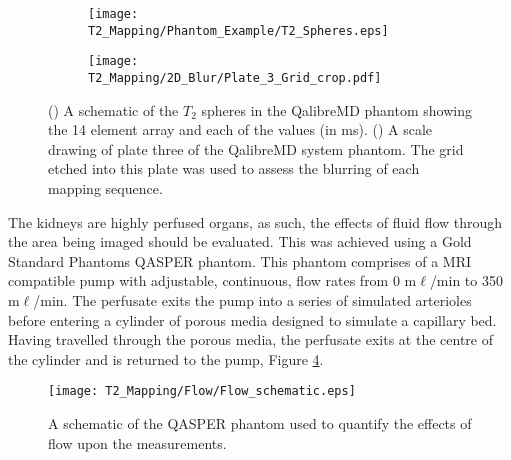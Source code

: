 \begin{figure}[H]
\centering
\begin{subfigure}[c]{0.47\textwidth}
	\centering
	\texttt{[image: T2\_Mapping/Phantom\_Example/T2\_Spheres.eps]}
	\caption{}
	\label{fig:t2_phantom_schematic}
\end{subfigure}
\hfill
\begin{subfigure}[c]{0.47\textwidth}
	\centering
	\texttt{[image: T2\_Mapping/2D\_Blur/Plate\_3\_Grid\_crop.pdf]}
	\caption{}
	\label{fig:t2_blur_grid}
\end{subfigure}
\caption{() A schematic of the $T_2$ spheres in the QalibreMD phantom showing the 14 element \ttwo array and each of the \ttwo values (in ms). () A scale drawing of plate three of the QalibreMD system phantom. The grid etched into this plate was used to assess the blurring of each \ttwo mapping sequence.}
\label{fig:t2_nist_phantom}
\end{figure}

The kidneys are highly perfused organs, as such, the effects of fluid flow through the area being imaged should be evaluated. This was achieved using a Gold Standard Phantoms \ac{QASPER} phantom. This phantom comprises of a \ac{MRI} compatible pump with adjustable, continuous, flow rates from 0 m$\ell$/min to 350 m$\ell$/min. The perfusate exits the pump into a series of simulated arterioles before entering a cylinder of porous media designed to simulate a capillary bed. Having travelled through the porous media, the perfusate exits at the centre of the cylinder and is returned to the pump, Figure \ref{fig:t2_flow_phantom_schematic}. 

\begin{figure}[H]
	\centering
	\texttt{[image: T2\_Mapping/Flow/Flow\_schematic.eps]}
	\caption{A schematic of the \ac{QASPER} phantom used to quantify the effects of flow upon the \ttwo measurements.}
	\label{fig:t2_flow_phantom_schematic}	
\end{figure}

